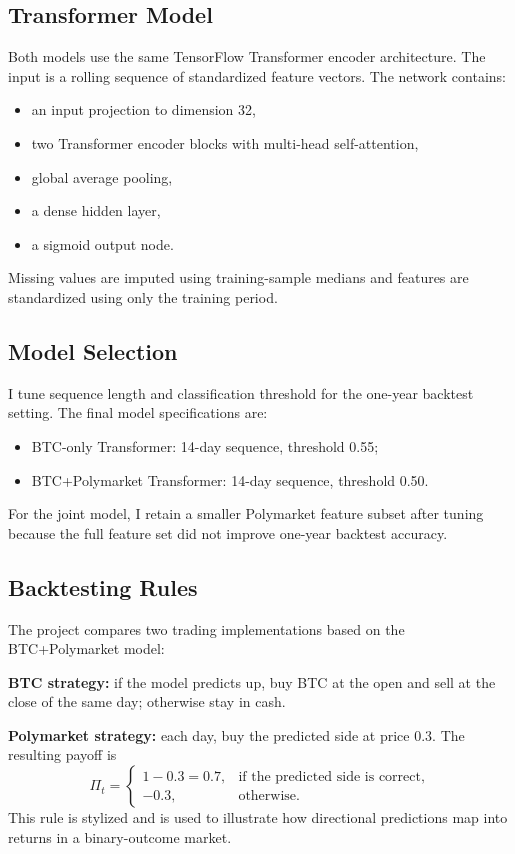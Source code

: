\documentclass[conference]{IEEEtran}
\begin{document}
\subsection{Transformer Model}
Both models use the same TensorFlow Transformer encoder architecture. The input is a rolling sequence of standardized feature vectors. The network contains:
\begin{itemize}
\item an input projection to dimension 32,
\item two Transformer encoder blocks with multi-head self-attention,
\item global average pooling,
\item a dense hidden layer,
\item a sigmoid output node.
\end{itemize}

Missing values are imputed using training-sample medians and features are standardized using only the training period.

\subsection{Model Selection}
I tune sequence length and classification threshold for the one-year backtest setting. The final model specifications are:
\begin{itemize}
\item BTC-only Transformer: 14-day sequence, threshold 0.55;
\item BTC+Polymarket Transformer: 14-day sequence, threshold 0.50.
\end{itemize}

For the joint model, I retain a smaller Polymarket feature subset after tuning because the full feature set did not improve one-year backtest accuracy.

\subsection{Backtesting Rules}
The project compares two trading implementations based on the BTC+Polymarket model:

\textbf{BTC strategy:} if the model predicts up, buy BTC at the open and sell at the close of the same day; otherwise stay in cash.

\textbf{Polymarket strategy:} each day, buy the predicted side at price 0.3. The resulting payoff is
\[
\Pi_t =
\begin{cases}
1 - 0.3 = 0.7, & \text{if the predicted side is correct},\\
-0.3, & \text{otherwise.}
\end{cases}
\]
This rule is stylized and is used to illustrate how directional predictions map into returns in a binary-outcome market.
\end{document}
